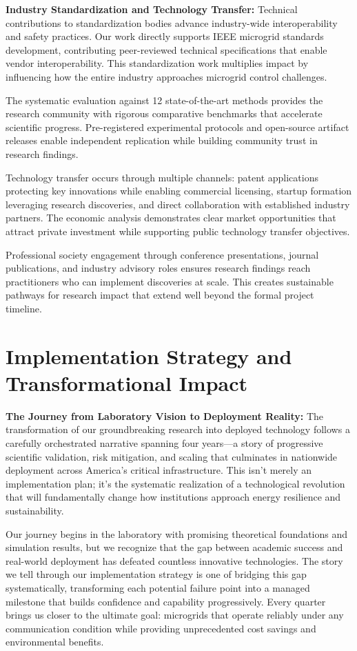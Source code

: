 \documentclass[12pt]{article}
\begin{document}
\textbf{Industry Standardization and Technology Transfer:} Technical contributions to standardization bodies advance industry-wide interoperability and safety practices. Our work directly supports IEEE microgrid standards development, contributing peer-reviewed technical specifications that enable vendor interoperability. This standardization work multiplies impact by influencing how the entire industry approaches microgrid control challenges.

The systematic evaluation against 12 state-of-the-art methods \cite{our2024comparative} provides the research community with rigorous comparative benchmarks that accelerate scientific progress. Pre-registered experimental protocols and open-source artifact releases enable independent replication while building community trust in research findings.

Technology transfer occurs through multiple channels: patent applications protecting key innovations while enabling commercial licensing, startup formation leveraging research discoveries, and direct collaboration with established industry partners. The economic analysis demonstrates clear market opportunities that attract private investment while supporting public technology transfer objectives.

Professional society engagement through conference presentations, journal publications, and industry advisory roles ensures research findings reach practitioners who can implement discoveries at scale. This creates sustainable pathways for research impact that extend well beyond the formal project timeline.

\section{Implementation Strategy and Transformational Impact}

\textbf{The Journey from Laboratory Vision to Deployment Reality:} The transformation of our groundbreaking research into deployed technology follows a carefully orchestrated narrative spanning four years—a story of progressive scientific validation, risk mitigation, and scaling that culminates in nationwide deployment across America's critical infrastructure. This isn't merely an implementation plan; it's the systematic realization of a technological revolution that will fundamentally change how institutions approach energy resilience and sustainability.

Our journey begins in the laboratory with promising theoretical foundations and simulation results, but we recognize that the gap between academic success and real-world deployment has defeated countless innovative technologies. The story we tell through our implementation strategy is one of bridging this gap systematically, transforming each potential failure point into a managed milestone that builds confidence and capability progressively. Every quarter brings us closer to the ultimate goal: microgrids that operate reliably under any communication condition while providing unprecedented cost savings and environmental benefits.
\end{document}
